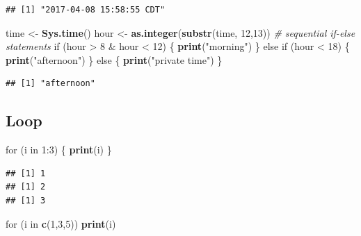 \documentclass[]{book}
\newenvironment{Shaded}{\begin{snugshade}}{\end{snugshade}}
\newcommand{\KeywordTok}[1]{\textcolor[rgb]{0.13,0.29,0.53}{\textbf{{#1}}}}
\newcommand{\DecValTok}[1]{\textcolor[rgb]{0.00,0.00,0.81}{{#1}}}
\newcommand{\StringTok}[1]{\textcolor[rgb]{0.31,0.60,0.02}{{#1}}}
\newcommand{\CommentTok}[1]{\textcolor[rgb]{0.56,0.35,0.01}{\textit{{#1}}}}
\newcommand{\NormalTok}[1]{{#1}}
\theoremstyle{definition}
\theoremstyle{definition}
\theoremstyle{remark}
\begin{document}
\begin{verbatim}
## [1] "2017-04-08 15:58:55 CDT"
\end{verbatim}

\begin{Shaded}
\begin{Highlighting}[]
\NormalTok{time <-}\StringTok{ }\KeywordTok{Sys.time}\NormalTok{()}
\NormalTok{hour <-}\StringTok{ }\KeywordTok{as.integer}\NormalTok{(}\KeywordTok{substr}\NormalTok{(time, }\DecValTok{12}\NormalTok{,}\DecValTok{13}\NormalTok{))}
\CommentTok{# sequential if-else statements}
\NormalTok{if (hour >}\StringTok{ }\DecValTok{8} \NormalTok{&}\StringTok{ }\NormalTok{hour <}\StringTok{ }\DecValTok{12}\NormalTok{) \{}
    \KeywordTok{print}\NormalTok{(}\StringTok{"morning"}\NormalTok{)}
\NormalTok{\} else if (hour <}\StringTok{ }\DecValTok{18}\NormalTok{) \{}
    \KeywordTok{print}\NormalTok{(}\StringTok{"afternoon"}\NormalTok{)}
\NormalTok{\} else \{}
    \KeywordTok{print}\NormalTok{(}\StringTok{"private time"}\NormalTok{)}
\NormalTok{\}}
\end{Highlighting}
\end{Shaded}

\begin{verbatim}
## [1] "afternoon"
\end{verbatim}

\subsection{Loop}\label{loop}

\begin{Shaded}
\begin{Highlighting}[]
\NormalTok{for (i in }\DecValTok{1}\NormalTok{:}\DecValTok{3}\NormalTok{) \{}
  \KeywordTok{print}\NormalTok{(i)}
\NormalTok{\}}
\end{Highlighting}
\end{Shaded}

\begin{verbatim}
## [1] 1
## [1] 2
## [1] 3
\end{verbatim}

\begin{Shaded}
\begin{Highlighting}[]
\NormalTok{for (i in }\KeywordTok{c}\NormalTok{(}\DecValTok{1}\NormalTok{,}\DecValTok{3}\NormalTok{,}\DecValTok{5}\NormalTok{)) }\KeywordTok{print}\NormalTok{(i)}
\end{Highlighting}
\end{Shaded}
\end{document}
